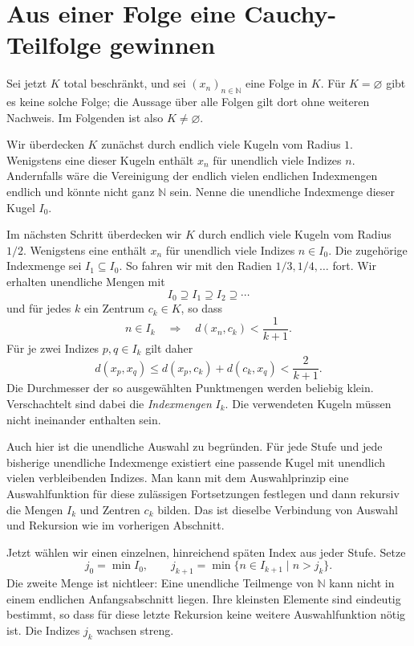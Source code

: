\section*{Aus einer Folge eine Cauchy-Teilfolge gewinnen}

Sei jetzt \(K\) total beschränkt, und sei \((x_n)_{n\in\mathbb N}\)
eine Folge in \(K\). Für \(K=\varnothing\) gibt es keine solche
Folge; die Aussage über alle Folgen gilt dort ohne weiteren Nachweis.
Im Folgenden ist also \(K\ne\varnothing\).

Wir überdecken \(K\) zunächst durch endlich viele Kugeln vom
Radius \(1\). Wenigstens eine dieser Kugeln enthält \(x_n\) für
unendlich viele Indizes \(n\). Andernfalls wäre die Vereinigung
der endlich vielen endlichen Indexmengen endlich und könnte nicht
ganz \(\mathbb N\) sein. Nenne die unendliche Indexmenge dieser
Kugel \(I_0\).

Im nächsten Schritt überdecken wir \(K\) durch endlich viele Kugeln
vom Radius \(1/2\). Wenigstens eine enthält \(x_n\) für unendlich
viele Indizes \(n\in I_0\). Die zugehörige Indexmenge sei
\(I_1\subseteq I_0\). So fahren wir mit den Radien
\(1/3,1/4,\ldots\) fort. Wir erhalten unendliche Mengen mit
\[
 I_0\supseteq I_1\supseteq I_2\supseteq\cdots
\]
und für jedes \(k\) ein Zentrum \(c_k\in K\), so dass
\[
 n\in I_k\quad\Longrightarrow\quad
              d(x_n,c_k)<\frac1{k+1}.
\]
Für je zwei Indizes \(p,q\in I_k\) gilt daher
\[
 d(x_p,x_q)
 \leq d(x_p,c_k)+d(c_k,x_q)<\frac2{k+1}.
\]
Die Durchmesser der so ausgewählten Punktmengen werden beliebig
klein. Verschachtelt sind dabei die \emph{Indexmengen} \(I_k\).
Die verwendeten Kugeln müssen nicht ineinander enthalten sein.

Auch hier ist die unendliche Auswahl zu begründen. Für jede Stufe
und jede bisherige unendliche Indexmenge existiert eine passende
Kugel mit unendlich vielen verbleibenden Indizes. Man kann mit
dem Auswahlprinzip eine Auswahlfunktion für diese zulässigen
Fortsetzungen festlegen und dann rekursiv die Mengen \(I_k\)
und Zentren \(c_k\) bilden. Das ist dieselbe Verbindung von
Auswahl und Rekursion wie im vorherigen Abschnitt.

Jetzt wählen wir einen einzelnen, hinreichend späten Index aus
jeder Stufe. Setze
\[
 j_0=\min I_0,\qquad
 j_{k+1}=\min\{n\in I_{k+1}\mid n>j_k\}.
\]
Die zweite Menge ist nichtleer: Eine unendliche Teilmenge von
\(\mathbb N\) kann nicht in einem endlichen Anfangsabschnitt
liegen. Ihre kleinsten Elemente sind eindeutig bestimmt, so dass
für diese letzte Rekursion keine weitere Auswahlfunktion nötig ist.
Die Indizes \(j_k\) wachsen streng.

